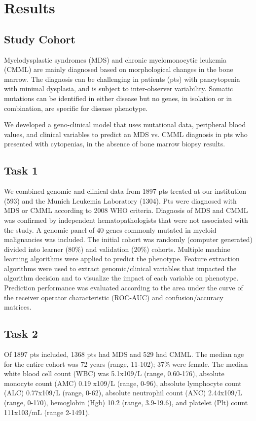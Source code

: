 \section{Results}%
\subsection{Study Cohort}%

Myelodysplastic syndromes (MDS) and chronic myelomonocytic leukemia (CMML) are mainly diagnosed based on morphological changes in the bone marrow. The diagnosis can be challenging in patients (pts) with pancytopenia with minimal dysplasia, and is subject to inter-observer variability. Somatic mutations can be identified in either disease but no genes, in isolation or in combination, are specific for disease phenotype.

We developed a geno-clinical model that uses mutational data, peripheral blood values, and clinical variables to predict an MDS vs. CMML diagnosis in pts who presented with cytopenias, in the absence of bone marrow biopsy results.


\subsection{Task 1}%

We combined genomic and clinical data from 1897 pts treated at our institution (593) and the Munich Leukemia Laboratory (1304). Pts were diagnosed with MDS or CMML according to 2008 WHO criteria. Diagnosis of MDS and CMML was confirmed by independent hematopathologists that were not associated with the study. A genomic panel of 40 genes commonly mutated in myeloid malignancies was included. The initial cohort was randomly (computer generated) divided into learner (80\%) and validation (20\%) cohorts. Multiple machine learning algorithms were applied to predict the phenotype. Feature extraction algorithms were used to extract genomic/clinical variables that impacted the algorithm decision and to visualize the impact of each variable on phenotype. Prediction performance was evaluated according to the area under the curve of the receiver operator characteristic (ROC-AUC) and confusion/accuracy matrices.


\subsection{Task 2}%

Of 1897 pts included, 1368 pts had MDS and 529 had CMML. The median age for the entire cohort was 72 years (range, 11-102); 37\% were female. The median white blood cell count (WBC) was 5.1x109/L (range, 0.60-176), absolute monocyte count (AMC) 0.19 x109/L (range, 0-96), absolute lymphocyte count (ALC) 0.77x109/L (range, 0-62), absolute neutrophil count (ANC) 2.44x109/L (range, 0-170), hemoglobin (Hgb) 10.2 (range, 3.9-19.6), and platelet (Plt) count 111x103/mL (range 2-1491).


